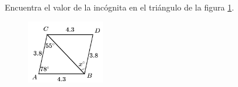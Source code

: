 \question[10]  Encuentra el valor de la incógnita en el triángulo de la figura \ref{fig:angle_triangle_05}.
\begin{figure}[H]
    \begin{center}
        \includegraphics[width=0.3\textwidth]{../images/angle_triangle_05.png}
    \end{center}
    \caption{}
    \label{fig:angle_triangle_05}
\end{figure}